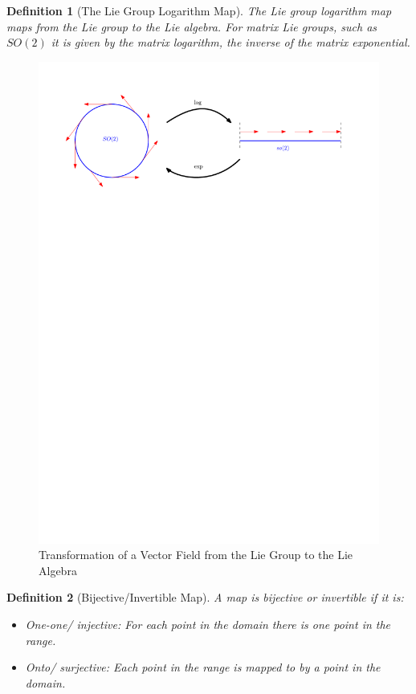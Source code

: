 \documentclass{book}
\newtheorem{definition}{Definition}
\begin{document}
\begin{definition}[The Lie Group Logarithm Map]
The Lie group logarithm map maps from the Lie group to the Lie algebra.
For matrix Lie groups, such as $SO(2)$ it is given by the matrix
logarithm, the inverse of the matrix exponential.
\end{definition}

\begin{figure}[htp]
    \centering
    \includegraphics[width=\textwidth]{SO2_so2_vector_field}
    \caption{Transformation of a Vector Field from the Lie Group to the Lie Algebra}
\end{figure}

\begin{definition}[Bijective/Invertible Map]
A map is bijective or invertible if it is:
\begin{itemize}
    \item One-one/ injective: For each point in the domain there is one point in the range.
    \item Onto/ surjective: Each point in the range is mapped to by a point in the domain.
\end{itemize}
\end{definition}
\end{document}
